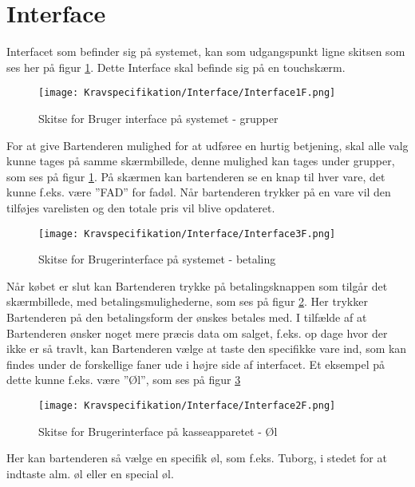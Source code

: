 \section{Interface}
Interfacet som befinder sig på systemet, kan som udgangspunkt ligne skitsen som ses her på figur \ref{fig:Interface1}. Dette Interface skal befinde sig på en touchskærm.

\begin{figure}[ht]
	\centering
	\texttt{[image: Kravspecifikation/Interface/Interface1F.png]}
	\caption{Skitse for Bruger interface på systemet - grupper}
	\label{fig:Interface1}
\end{figure}

For at give Bartenderen mulighed for at udføree en hurtig betjening, skal alle valg kunne tages på samme skærmbillede, denne mulighed kan tages under grupper, som ses på figur \ref{fig:Interface1}. 
\newline\newline
På skærmen kan bartenderen se en knap til hver vare, det kunne f.eks. være ''FAD'' for fadøl. Når bartenderen trykker på en vare vil den tilføjes varelisten og den totale pris vil blive opdateret. 

\begin{figure}[H]
	\centering
	\texttt{[image: Kravspecifikation/Interface/Interface3F.png]}
	\caption{Skitse for Brugerinterface på systemet - betaling}
	\label{fig:Interface3}
\end{figure}
Når købet er slut kan Bartenderen trykke på betalingsknappen som tilgår det skærmbillede, med betalingsmulighederne, som ses på figur \ref{fig:Interface3}. Her trykker Bartenderen på den betalingsform der ønskes betales med. 
\newpage
I tilfælde af at Bartenderen ønsker noget mere præcis data om salget, f.eks. op dage hvor der ikke er så travlt, kan Bartenderen vælge at taste den specifikke vare ind, som kan findes under de forskellige faner ude i højre side af interfacet. Et eksempel på dette kunne f.eks. være ''Øl'', som ses på figur \ref{fig:Interface2}

\begin{figure}[ht]
	\centering
	\texttt{[image: Kravspecifikation/Interface/Interface2F.png]}
	\caption{Skitse for Brugerinterface på kasseapparetet - Øl}
	\label{fig:Interface2}
\end{figure}

Her kan bartenderen så vælge en specifik øl, som f.eks. Tuborg, i stedet for at indtaste alm. øl eller en special øl.

